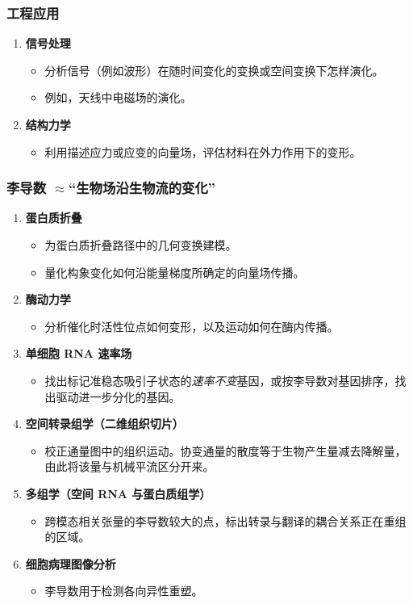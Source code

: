 \subsubsection{工程应用}
\begin{enumerate}[label=\alph*.]
  \item \textbf{信号处理}
  \begin{itemize}
    \item 分析信号（例如波形）在随时间变化的变换或空间变换下怎样演化。
    \item 例如，天线中电磁场的演化。
  \end{itemize}
  \item \textbf{结构力学}
  \begin{itemize}
    \item 利用描述应力或应变的向量场，评估材料在外力作用下的变形。
  \end{itemize}
\end{enumerate}

\subsubsection{\texorpdfstring{李导数 $\approx$“生物场沿生物流的变化”}{李导数近似表示生物场沿生物流的变化}}
\begin{enumerate}[label=\alph*.]
  \item \textbf{蛋白质折叠}
  \begin{itemize}
    \item 为蛋白质折叠路径中的几何变换建模。
    \item 量化构象变化如何沿能量梯度所确定的向量场传播。
  \end{itemize}
  \item \textbf{酶动力学}
  \begin{itemize}
    \item 分析催化时活性位点如何变形，以及运动如何在酶内传播。
  \end{itemize}
  \item \textbf{单细胞 RNA 速率场}
  \begin{itemize}
    \item 找出标记准稳态吸引子状态的\emph{速率不变}基因，或按李导数对基因排序，找出驱动进一步分化的基因。
  \end{itemize}
  \item \textbf{空间转录组学（二维组织切片）}
  \begin{itemize}
    \item 校正通量图中的组织运动。协变通量的散度等于生物产生量减去降解量，由此将该量与机械平流区分开来。
  \end{itemize}
  \item \textbf{多组学（空间 RNA 与蛋白质组学）}
  \begin{itemize}
    \item 跨模态相关张量的李导数较大的点，标出转录与翻译的耦合关系正在重组的区域。
  \end{itemize}
  \item \textbf{细胞病理图像分析}
  \begin{itemize}
    \item 李导数用于检测各向异性重塑。
  \end{itemize}
\end{enumerate}

